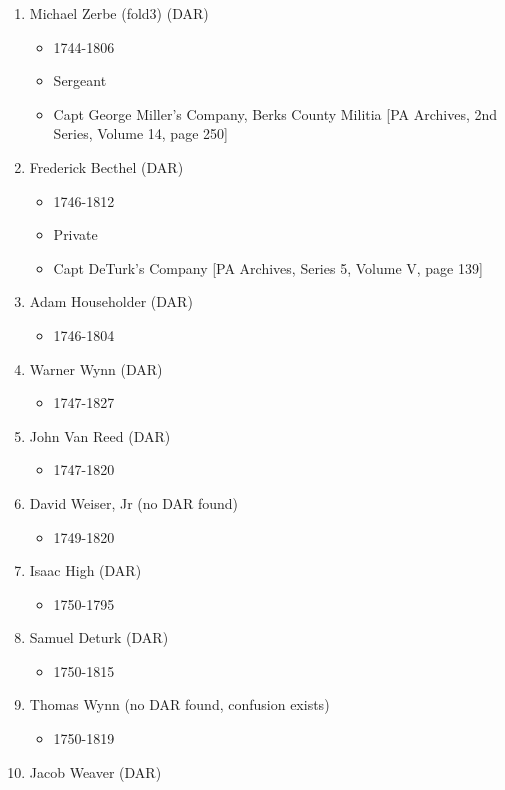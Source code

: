 \documentclass[11pt,letter]{book}
\begin{document}
\begin{enumerate}
\item Michael Zerbe (fold3) (DAR)
\begin{itemize}
\item 1744-1806
\item Sergeant
\item Capt George Miller's Company, Berks County Militia [PA Archives, 2nd Series, Volume 14, page 250]
\end{itemize}
\item Frederick Becthel (DAR)
\begin{itemize}
\item 1746-1812
\item Private
\item Capt DeTurk's Company [PA Archives, Series 5, Volume V, page 139]
\end{itemize}
\item Adam Householder (DAR)
\begin{itemize}
\item 1746-1804
\end{itemize}
\item Warner Wynn (DAR)
\begin{itemize}
\item 1747-1827
\end{itemize}
\item John Van Reed (DAR)
\begin{itemize}
\item 1747-1820
\end{itemize}
\item David Weiser, Jr (no DAR found)
\begin{itemize}
\item 1749-1820
\end{itemize}
\item Isaac High (DAR)
\begin{itemize}
\item 1750-1795
\end{itemize}
\item Samuel Deturk (DAR)
\begin{itemize}
\item 1750-1815
\end{itemize}
\item Thomas Wynn (no DAR found, confusion exists)
\begin{itemize}
\item 1750-1819
\end{itemize}
\item Jacob Weaver (DAR)
\begin{itemize}

\end{itemize}
\end{enumerate}
\end{document}
